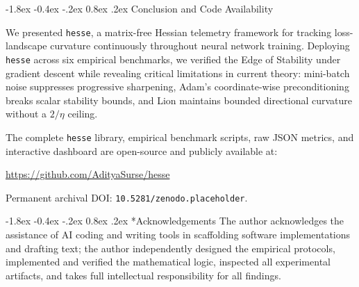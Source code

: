 \documentclass[10pt,twocolumn]{article}
\makeatletter
\renewcommand\section{\@startsection {section}{1}{\z@}%
                                   {-1.8ex \@plus -0.4ex \@minus -.2ex}%
                                   {0.8ex \@plus .2ex}%
                                   {\normalfont\large\bfseries}}
\makeatother
\begin{document}
\section{Conclusion and Code Availability}

We presented \texttt{hesse}, a matrix-free Hessian telemetry framework for tracking loss-landscape curvature continuously throughout neural network training. Deploying \texttt{hesse} across six empirical benchmarks, we verified the Edge of Stability under gradient descent while revealing critical limitations in current theory: mini-batch noise suppresses progressive sharpening, Adam's coordinate-wise preconditioning breaks scalar stability bounds, and Lion maintains bounded directional curvature without a $2/\eta$ ceiling.

The complete \texttt{hesse} library, empirical benchmark scripts, raw JSON metrics, and interactive dashboard are open-source and publicly available at:
\begin{center}
\url{https://github.com/AdityaSurse/hesse}
\end{center}
Permanent archival DOI: \texttt{10.5281/zenodo.placeholder}.

\section*{Acknowledgements}
The author acknowledges the assistance of AI coding and writing tools in scaffolding software implementations and drafting text; the author independently designed the empirical protocols, implemented and verified the mathematical logic, inspected all experimental artifacts, and takes full intellectual responsibility for all findings.

{\small


}
\end{document}
